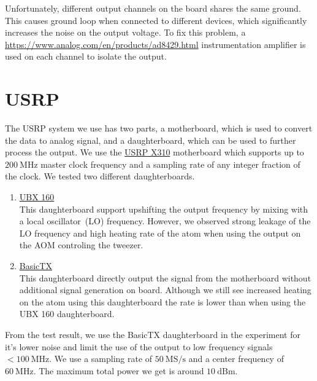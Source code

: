 Unfortunately, different output channels on the board shares the same ground.
This causes ground loop when connected to different devices,
which significantly increases the noise on the output voltage.
To fix this problem, a \href{AD8429}{https://www.analog.com/en/products/ad8429.html}
instrumentation amplifier is used on each channel to isolate the output.

\section{USRP}
\label{appendex:computer-control:usrp}

The USRP system we use has two parts,
a motherboard, which is used to convert the data to analog signal,
and a daughterboard, which can be used to further process the output.
We use the \href{https://www.ettus.com/all-products/x310-kit/}{USRP X310}
motherboard which supports up to $200~\mathrm{MHz}$ master clock frequency
and a sampling rate of any integer fraction of the clock.
We tested two different daughterboards.
\begin{enumerate}
\item \href{https://www.ettus.com/all-products/ubx160/}{UBX 160}\\
  This daughterboard support upshifting the output frequency
  by mixing with a local oscillator~(LO) frequency.
  However, we observed strong leakage of the LO frequency
  and high heating rate of the atom when using the output on the AOM controling the tweezer.
\item \href{https://www.ettus.com/all-products/basictx/}{BasicTX}\\
  This daughterboard directly output the signal from the motherboard
  without additional signal generation on board.
  Although we still see increased heating on the atom using this daughterboard
  the rate is lower than when using the UBX 160 daughterboard.
\end{enumerate}
From the test result, we use the BasicTX daughterboard in the experiment
for it's lower noise and limit the use of the output
to low frequency signals $<\!100~\mathrm{MHz}$.
We use a sampling rate of $50~\mathrm{MS/s}$ and a center frequency of $60~\mathrm{MHz}$.
The maximum total power we get is around $10~\mathrm{dBm}$.
